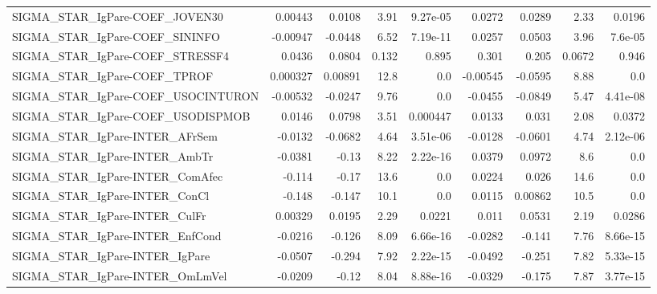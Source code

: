\begin{tabular}{lrrrrrrrr}
SIGMA\_STAR\_IgPare-COEF\_JOVEN30         &     0.00443 &       0.0108 &     3.91 & 9.27e-05 &     0.0272 &      0.0289 &         2.33 &        0.0196 \\
SIGMA\_STAR\_IgPare-COEF\_SININFO         &    -0.00947 &      -0.0448 &     6.52 & 7.19e-11 &     0.0257 &      0.0503 &         3.96 &       7.6e-05 \\
SIGMA\_STAR\_IgPare-COEF\_STRESSF4        &      0.0436 &       0.0804 &    0.132 &    0.895 &      0.301 &       0.205 &       0.0672 &         0.946 \\
SIGMA\_STAR\_IgPare-COEF\_TPROF           &    0.000327 &      0.00891 &     12.8 &      0.0 &   -0.00545 &     -0.0595 &         8.88 &           0.0 \\
SIGMA\_STAR\_IgPare-COEF\_USOCINTURON     &    -0.00532 &      -0.0247 &     9.76 &      0.0 &    -0.0455 &     -0.0849 &         5.47 &      4.41e-08 \\
SIGMA\_STAR\_IgPare-COEF\_USODISPMOB      &      0.0146 &       0.0798 &     3.51 & 0.000447 &     0.0133 &       0.031 &         2.08 &        0.0372 \\
SIGMA\_STAR\_IgPare-INTER\_AFrSem         &     -0.0132 &      -0.0682 &     4.64 & 3.51e-06 &    -0.0128 &     -0.0601 &         4.74 &      2.12e-06 \\
SIGMA\_STAR\_IgPare-INTER\_AmbTr          &     -0.0381 &        -0.13 &     8.22 & 2.22e-16 &     0.0379 &      0.0972 &          8.6 &           0.0 \\
SIGMA\_STAR\_IgPare-INTER\_ComAfec        &      -0.114 &        -0.17 &     13.6 &      0.0 &     0.0224 &       0.026 &         14.6 &           0.0 \\
SIGMA\_STAR\_IgPare-INTER\_ConCl          &      -0.148 &       -0.147 &     10.1 &      0.0 &     0.0115 &     0.00862 &         10.5 &           0.0 \\
SIGMA\_STAR\_IgPare-INTER\_CulFr          &     0.00329 &       0.0195 &     2.29 &   0.0221 &      0.011 &      0.0531 &         2.19 &        0.0286 \\
SIGMA\_STAR\_IgPare-INTER\_EnfCond        &     -0.0216 &       -0.126 &     8.09 & 6.66e-16 &    -0.0282 &      -0.141 &         7.76 &      8.66e-15 \\
SIGMA\_STAR\_IgPare-INTER\_IgPare         &     -0.0507 &       -0.294 &     7.92 & 2.22e-15 &    -0.0492 &      -0.251 &         7.82 &      5.33e-15 \\
SIGMA\_STAR\_IgPare-INTER\_OmLmVel        &     -0.0209 &        -0.12 &     8.04 & 8.88e-16 &    -0.0329 &      -0.175 &         7.87 &      3.77e-15 \\

\end{tabular}
